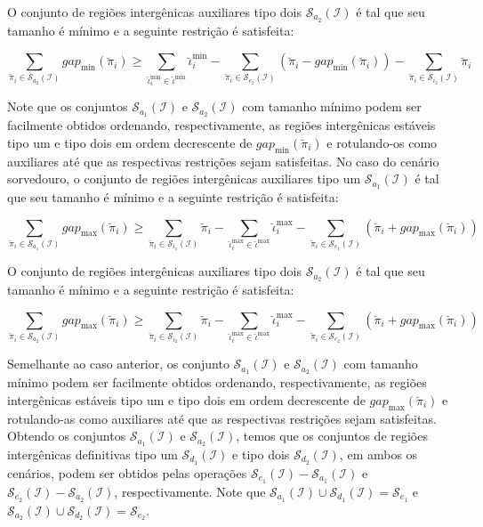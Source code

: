 O conjunto de regiões intergênicas auxiliares tipo dois $\mathcal{S}_{a_{2}}(\mathcal{I})$ é tal que seu tamanho é mínimo e a seguinte restrição é satisfeita:

$$\sum_{\breve\pi_i \in \mathcal{S}_{a_{2}}(\mathcal{I})} gap_{\min}(\breve\pi_i) \ge \sum_{\breve\iota_{i}^{\min}  \in \breve\iota^{\min}} \breve\iota_{i}^{\min} - \sum_{\breve\pi_i \in \mathcal{S}_{e_{2}}(\mathcal{I})} (\breve\pi_i - gap_{\min}(\breve\pi_i)) - \sum_{\breve\pi_i \in \mathcal{S}_{i_{2}}(\mathcal{I})} \breve\pi_i$$

Note que os conjuntos $\mathcal{S}_{a_{1}}(\mathcal{I})$  e $\mathcal{S}_{a_{2}}(\mathcal{I})$ com tamanho mínimo podem ser facilmente obtidos ordenando, respectivamente, as regiões intergênicas estáveis tipo um e tipo dois em ordem decrescente de $gap_{\min}(\breve\pi_i)$ e rotulando-os como auxiliares até que as respectivas restrições sejam satisfeitas. No caso do cenário sorvedouro, o conjunto de regiões intergênicas auxiliares tipo um $\mathcal{S}_{a_{1}}(\mathcal{I})$ é tal que seu tamanho é mínimo e a seguinte restrição é satisfeita:

$$\sum_{\breve\pi_i \in \mathcal{S}_{a_{1}}(\mathcal{I})} gap_{\max}(\breve\pi_i) \ge \sum_{\breve\pi_i \in \mathcal{S}_{i_{1}}(\mathcal{I})} \breve\pi_i - \sum_{\breve\iota_{i}^{\max}  \in \breve\iota^{\max}} \breve\iota_{i}^{\max} - \sum_{\breve\pi_i \in \mathcal{S}_{e_{1}}(\mathcal{I})} (\breve\pi_i + gap_{\max}(\breve\pi_i))$$

O conjunto de regiões intergênicas auxiliares tipo dois $\mathcal{S}_{a_{2}}(\mathcal{I})$ é tal que seu tamanho é mínimo e a seguinte restrição é satisfeita:

$$\sum_{\breve\pi_i \in \mathcal{S}_{a_{2}}(\mathcal{I})} gap_{\max}(\breve\pi_i) \ge \sum_{\breve\pi_i \in \mathcal{S}_{i_{2}}(\mathcal{I})} \breve\pi_i - \sum_{\breve\iota_{i}^{\max}  \in \breve\iota^{\max}} \breve\iota_{i}^{\max} - \sum_{\breve\pi_i \in \mathcal{S}_{e_{2}}(\mathcal{I})} (\breve\pi_i + gap_{\max}(\breve\pi_i))$$

Semelhante ao caso anterior, os conjunto $\mathcal{S}_{a_{1}}(\mathcal{I})$ e $\mathcal{S}_{a_{2}}(\mathcal{I})$ com tamanho mínimo podem ser facilmente obtidos ordenando, respectivamente, as regiões intergênicas estáveis tipo um e tipo dois em ordem decrescente de $gap_{\max}(\breve\pi_i)$ e rotulando-as como auxiliares até que as respectivas restrições sejam satisfeitas. Obtendo os conjuntos $\mathcal{S}_{a_{1}}(\mathcal{I})$ e $\mathcal{S}_{a_{2}}(\mathcal{I})$, temos que os conjuntos de regiões intergênicas definitivas tipo um $\mathcal{S}_{d_{1}}(\mathcal{I})$ e tipo dois $\mathcal{S}_{d_{2}}(\mathcal{I})$, em ambos os cenários, podem ser obtidos pelas operações $\mathcal{S}_{e_{1}}(\mathcal{I}) - \mathcal{S}_{a_{1}}(\mathcal{I})$ e $\mathcal{S}_{e_{2}}(\mathcal{I}) - \mathcal{S}_{a_{2}}(\mathcal{I})$, respectivamente. Note que $\mathcal{S}_{a_{1}}(\mathcal{I}) \cup \mathcal{S}_{d_{1}}(\mathcal{I}) = \mathcal{S}_{e_{1}}$ e $\mathcal{S}_{a_{2}}(\mathcal{I}) \cup \mathcal{S}_{d_{2}}(\mathcal{I}) = \mathcal{S}_{e_{2}}$.

